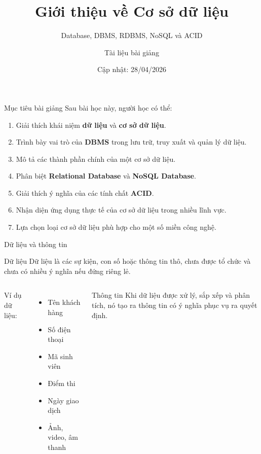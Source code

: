 ﻿\documentclass[aspectratio=169,11pt]{beamer}
\title[Giới thiệu về CSDL]{Giới thiệu về Cơ sở dữ liệu}
\subtitle{Database, DBMS, RDBMS, NoSQL và ACID}
\author{Tài liệu bài giảng}
\institute{Môn học: Cơ sở dữ liệu}
\date{Cập nhật: 28/04/2026}
\newcommand{\keyword}[1]{\textcolor{accent}{\textbf{#1}}}
\newcommand{\tightlist}{\setlength{\itemsep}{2pt}\setlength{\parskip}{0pt}}
\begin{document}
\begin{frame}
  \titlepage
\end{frame}

\begin{frame}{Mục tiêu bài giảng}
\small
Sau bài học này, người học có thể:
\begin{enumerate}
\tightlist
  \item Giải thích khái niệm \keyword{dữ liệu} và \keyword{cơ sở dữ liệu}.
  \item Trình bày vai trò của \keyword{DBMS} trong lưu trữ, truy xuất và quản lý dữ liệu.
  \item Mô tả các thành phần chính của một cơ sở dữ liệu.
  \item Phân biệt \keyword{Relational Database} và \keyword{NoSQL Database}.
  \item Giải thích ý nghĩa của các tính chất \keyword{ACID}.
  \item Nhận diện ứng dụng thực tế của cơ sở dữ liệu trong nhiều lĩnh vực.
  \item Lựa chọn loại cơ sở dữ liệu phù hợp cho một số miền công nghệ.
\end{enumerate}
\end{frame}

\begin{frame}{Dữ liệu và thông tin}
\small
\begin{block}{Dữ liệu}
Dữ liệu là các sự kiện, con số hoặc thông tin thô, chưa được tổ chức và chưa có nhiều ý nghĩa nếu đứng riêng lẻ.
\end{block}

\begin{columns}[T]
Ví dụ dữ liệu:
\begin{itemize}
\tightlist
  \item Tên khách hàng
  \item Số điện thoại
  \item Mã sinh viên
  \item Điểm thi
  \item Ngày giao dịch
  \item Ảnh, video, âm thanh
\end{itemize}

\begin{block}{Thông tin}
Khi dữ liệu được xử lý, sắp xếp và phân tích, nó tạo ra thông tin có ý nghĩa phục vụ ra quyết định.
\end{block}
\end{columns}
\end{frame}
\end{document}
